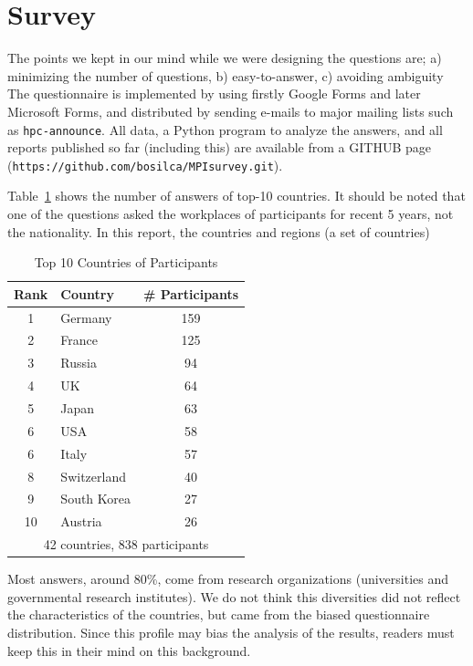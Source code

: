\documentclass[sigconf,nonacm]{acmart}
\begin{document}
\section{Survey}

The points we kept in our mind while we were designing the
questions are; a) minimizing the number of questions, b) easy-to-answer,
c) avoiding ambiguity
The questionnaire is implemented by using firstly Google Forms and
later Microsoft Forms, and distributed
by sending e-mails to major mailing lists such as {\tt hpc-announce}. 
All data, a Python program to analyze the answers, and all reports
published so far (including this) are available from a GITHUB page
({\tt https://github.com/bosilca/MPIsurvey.git}).  

Table~\ref{tab:countries} shows the number of answers of top-10
countries. It should be noted that one of the questions asked the
workplaces of participants for recent 5 years, not the nationality.
In this report, the countries and regions (a set of countries)

\begin{table}[htb]%
\begin{center}%
\caption{\small Top 10 Countries of Participants}
\vspace{-3mm}
\label{tab:countries}%
\begin{tabular}{c|l|c}%
\hline%
Rank & Country & \# Participants \\%
\hline%
1 & Germany 	& 159 \\%
2 & France 	& 125 \\%
3 & Russia 	& 94 \\%
4 & UK 		& 64 \\%
5 & Japan 	& 63 \\%
6 & USA 		& 58 \\%
6 & Italy 		& 57 \\%
\hline
8 & Switzerland & 40 \\%
9 & South Korea & 27 \\%
10 & Austria 	& 26  \\%
\hline%
\multicolumn{3}{c}{42 countries, 838 participants} \\%
\end{tabular}%
\end{center}%
\vspace{-8mm}
\end{table}%

Most answers, around 80\%, come from research organizations
(universities and governmental research institutes).  We do not think this
diversities did not reflect the characteristics of the countries, but
came from the biased questionnaire distribution. 
Since this profile may bias the analysis of the results, 
readers must keep this in their mind on this background.
\end{document}
